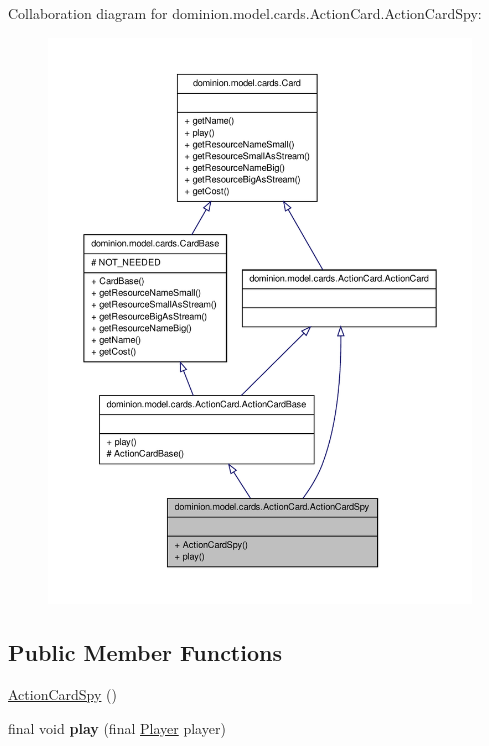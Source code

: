 \-Collaboration diagram for dominion.\-model.\-cards.\-Action\-Card.\-Action\-Card\-Spy\-:
\nopagebreak
\begin{figure}[H]
\begin{center}
\leavevmode
\includegraphics[width=350pt]{classdominion_1_1model_1_1cards_1_1ActionCard_1_1ActionCardSpy__coll__graph}
\end{center}
\end{figure}
\subsection*{\-Public \-Member \-Functions}
\begin{DoxyCompactItemize}
\item 
\hyperlink{classdominion_1_1model_1_1cards_1_1ActionCard_1_1ActionCardSpy_ac67c3ae3984de9d5c60fd25918ac847a}{\-Action\-Card\-Spy} ()
\item 
\hypertarget{classdominion_1_1model_1_1cards_1_1ActionCard_1_1ActionCardSpy_a0e404d912994bc07c09c101eff98bc08}{final void {\bfseries play} (final \hyperlink{interfacedominion_1_1model_1_1Player}{\-Player} player)}\label{classdominion_1_1model_1_1cards_1_1ActionCard_1_1ActionCardSpy_a0e404d912994bc07c09c101eff98bc08}

\end{DoxyCompactItemize}


